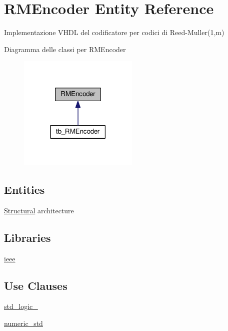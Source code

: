 \hypertarget{class_r_m_encoder}{\section{R\+M\+Encoder Entity Reference}
\label{class_r_m_encoder}
}


Implementazione V\+H\+D\+L del codificatore per codici di Reed-\/\+Muller(1,m)  




Diagramma delle classi per R\+M\+Encoder\nopagebreak
\begin{figure}[H]
\begin{center}
\leavevmode
\includegraphics[width=162pt]{class_r_m_encoder__inherit__graph}
\end{center}
\end{figure}
\subsection*{Entities}
\begin{DoxyCompactItemize}
\item 
\hyperlink{class_r_m_encoder_1_1_structural}{Structural} architecture
\end{DoxyCompactItemize}
\subsection*{Libraries}
 \begin{DoxyCompactItemize}
\item 
\hypertarget{class_r_m_encoder_ga0a6af6eef40212dbaf130d57ce711256}{\hyperlink{group___r_m_encoder_ga0a6af6eef40212dbaf130d57ce711256}{ieee} }\label{class_r_m_encoder_ga0a6af6eef40212dbaf130d57ce711256}

\end{DoxyCompactItemize}
\subsection*{Use Clauses}
 \begin{DoxyCompactItemize}
\item 
\hypertarget{class_r_m_encoder_gacd03516902501cd1c7296a98e22c6fcb}{\hyperlink{group___r_m_encoder_gacd03516902501cd1c7296a98e22c6fcb}{std\+\_\+logic\+\_}   }\label{class_r_m_encoder_gacd03516902501cd1c7296a98e22c6fcb}

\item 
\hypertarget{class_r_m_encoder_ga2edc34402b573437d5f25fa90ba4013e}{\hyperlink{group___r_m_encoder_ga2edc34402b573437d5f25fa90ba4013e}{numeric\+\_\+std}   }\label{class_r_m_encoder_ga2edc34402b573437d5f25fa90ba4013e}

\end{DoxyCompactItemize}
